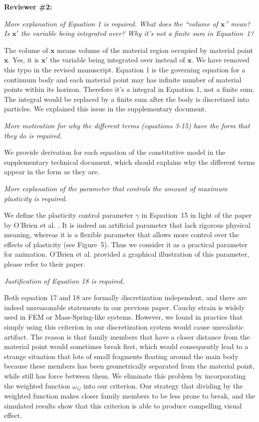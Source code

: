 \noindent{}\textbf{Reviewer \#2:}

\emph{More explanation of Equation 1 is required. What does the ``volume of $\mathbf{x}$'' mean? Is $\mathbf{x}'$ the variable being integrated over? Why it's not a finite sum in Equation~1?}

The volume of $\mathbf{x}$ means volume of the material region occupied by material point $\mathbf{x}$. Yes, it is $\mathbf{x}'$ the variable being integrated over instead of $\mathbf{x}$. We have removed this typo in the revised manuscript. Equation 1 is the governing equation for a continuum body and each material point may has infinite number of material points within its horizon. Therefore it's a integral in Equation 1, not a finite sum. The integral would be replaced by a finite sum after the body is discretized into particles. We explained this issue in the supplementary document.

\emph{More motivation for why the different terms (equations 3-15) have the form that they do is required.}

We provide derivation for each equation of the constitutive model in the supplementary technical document, which should explains why the different terms appear in the form as they are.

\emph{More explanation of the parameter that controls the amount of maximum plasticity is required.}

We define the plasticity control parameter $\gamma$ in Equation~15 in light of the paper by O'Brien et al. \cite{O'Brien:2002:GMA:566654.566579}. It is indeed an artificial parameter that lack rigorous physical meaning, whereas it is a flexible parameter that allows more control over the effects of plasticity (see Figure~5). Thus we consider it as a practical parameter for animation. O'Brien et al. \cite{O'Brien:2002:GMA:566654.566579} provided a graphical illustration of this parameter, please refer to their paper.

\emph{Justification of Equation 18 is required.}

Both equation 17 and 18 are formally discretization independent, and there are indeed unreasonable statements in our previous paper.
Cauchy strain is widely used in FEM or Mass-Spring-like systems.
However, we found in practice that simply using this criterion in our discretization system would cause unrealistic artifact. 
The reason is that family members that have a closer distance from the material point would sometimes break first,
which would consequently lead to a strange situation that lots of small fragments floating around the main body 
because these members has been geometrically separated from the material point, while still has force between them.
We eliminate this problem by incorporating the weighted function $\omega_{ij}$ into our criterion.
Our strategy that dividing by the weighted function makes closer family members to be less prone to break,
and the simulated results show that this criterion is able to produce compelling visual effect.

